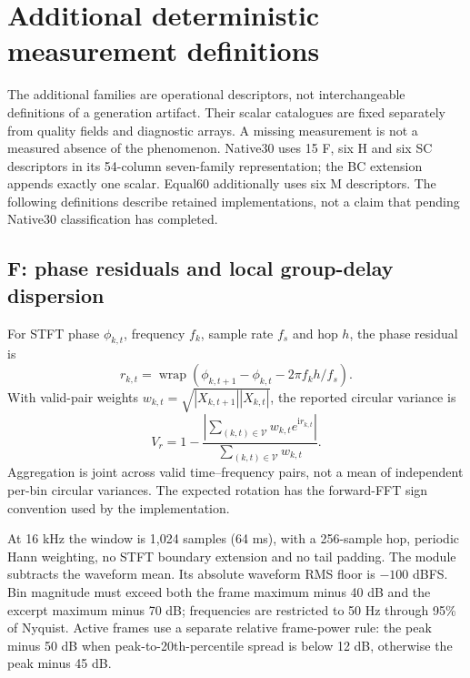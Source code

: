 \section{Additional deterministic measurement definitions}
\label{sec:additional-measurements}

The additional families are operational descriptors, not interchangeable
definitions of a generation artifact. Their scalar catalogues are fixed
separately from quality fields and diagnostic arrays. A missing measurement
is not a measured absence of the phenomenon. Native30 uses 15 F, six H and
six SC descriptors in its 54-column seven-family representation; the BC
extension appends exactly one scalar. Equal60 additionally uses six M
descriptors. The following definitions describe retained implementations,
not a claim that pending Native30 classification has completed.

\subsection{F: phase residuals and local group-delay dispersion}
For STFT phase $\phi_{k,t}$, frequency $f_k$, sample rate $f_s$ and hop $h$,
the phase residual is
\begin{equation}
 r_{k,t}=\operatorname{wrap}\left(\phi_{k,t+1}-\phi_{k,t}
                 -2\pi f_kh/f_s\right).
\end{equation}
With valid-pair weights $w_{k,t}=\sqrt{|X_{k,t+1}||X_{k,t}|}$,
the reported circular variance is
\begin{equation}
 V_r=1-\frac{\left|\sum_{(k,t)\in\mathcal V}
                     w_{k,t}e^{\mathrm{i}r_{k,t}}\right|}
                    {\sum_{(k,t)\in\mathcal V}w_{k,t}}.
\end{equation}
Aggregation is joint across valid time--frequency pairs, not a mean of
independent per-bin circular variances. The expected rotation has the
forward-FFT sign convention used by the implementation.

At 16 kHz the window is 1,024 samples (64 ms), with a 256-sample hop,
periodic Hann weighting, no STFT boundary extension and no tail padding.
The module subtracts the waveform mean. Its absolute waveform RMS floor
is $-100$ dBFS. Bin magnitude must exceed both the frame maximum minus
40 dB and the excerpt maximum minus 70 dB; frequencies are restricted to
50 Hz through 95\% of Nyquist. Active frames use a separate relative
frame-power rule: the peak minus 50 dB when peak-to-20th-percentile spread
is below 12 dB, otherwise the peak minus 45 dB.

